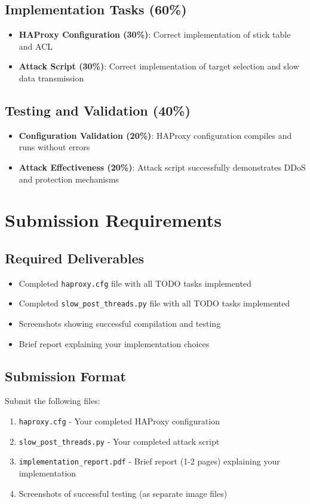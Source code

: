 \documentclass[12pt]{article}
\begin{document}
\subsection{Implementation Tasks (60\%)}
\begin{itemize}
    \item \textbf{HAProxy Configuration (30\%)}: Correct implementation of stick table and ACL
    \item \textbf{Attack Script (30\%)}: Correct implementation of target selection and slow data transmission
\end{itemize}

\subsection{Testing and Validation (40\%)}
\begin{itemize}
    \item \textbf{Configuration Validation (20\%)}: HAProxy configuration compiles and runs without errors
    \item \textbf{Attack Effectiveness (20\%)}: Attack script successfully demonstrates DDoS and protection mechanisms
\end{itemize}

\section{Submission Requirements}

\subsection{Required Deliverables}
\begin{itemize}
    \item Completed \texttt{haproxy.cfg} file with all TODO tasks implemented
    \item Completed \texttt{slow\_post\_threads.py} file with all TODO tasks implemented
    \item Screenshots showing successful compilation and testing
    \item Brief report explaining your implementation choices
\end{itemize}

\subsection{Submission Format}
Submit the following files:
\begin{enumerate}
    \item \texttt{haproxy.cfg} - Your completed HAProxy configuration
    \item \texttt{slow\_post\_threads.py} - Your completed attack script
    \item \texttt{implementation\_report.pdf} - Brief report (1-2 pages) explaining your implementation
    \item Screenshots of successful testing (as separate image files)
\end{enumerate}
\end{document}
